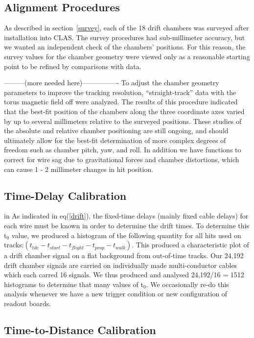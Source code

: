 \subsection{Alignment Procedures}
\label{align}

\hskip 0.15in
As described in section~\ref{survey}, each of the 18 drift chambers was 
surveyed after installation into CLAS.  The survey procedures had sub-millimeter
accuracy, but we wanted an independent check of the chambers' positions.  For 
this reason, the survey values for the chamber geometry were viewed only as 
a reasonable starting point to be refined by comparisons with data.

---------(more needed here)----------------
To adjust the chamber geometry parameters to improve the tracking resolution,
``straight-track'' data with the torus magnetic field off were analyzed.  The 
results of this procedure indicated that the best-fit position of the chambers 
along the three coordinate axes varied by up to several millimeters relative 
to the surveyed positions.  These studies of the absolute and relative chamber 
positioning are still ongoing, and should ultimately allow for the best-fit 
determination of more complex degrees of freedom such as chamber pitch, yaw, 
and roll.  In addition we have functions to correct for  wire sag due to 
gravitational forces and chamber distortions, which can cause 1 - 2 millimeter
changes in hit position.

\subsection{Time-Delay Calibration}
\label{tdlycal}

 in
As indicated in eq(\ref{drift}), the fixed-time delays (mainly fixed cable delays) 
for each wire must be known in order to determine the drift times.   To determine
this t$_0$ value, we produced a histogram of the following quantity for all hits
used on tracks:$ ( t_{tdc} - t_{start} - t_{flight} - t_{prop} - t_{walk} )$.
This produced a characteristic plot of a drift chamber signal on a flat
background from out-of-time tracks.  Our 24,192 drift chamber signals are carried
on individually made multi-conductor cables which each carred 16 signals.  We thus
produced and analysed 24,192/16 = 1512 histograms to determine that many values of
t$_0$. We occasionally re-do this analysis whenever we have a new trigger condition
or new configuration of readout boards.


\subsection{Time-to-Distance Calibration}
\label{tdistcal}

